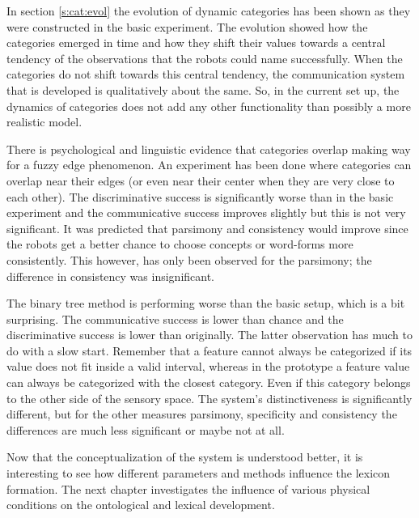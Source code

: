 \p
In section \ref{s:cat:evol} the evolution of dynamic categories has been shown as they were constructed in the basic experiment. The evolution showed how the categories emerged in time and how they shift their values towards a central tendency of the observations that the robots could name successfully. When the categories do not shift towards this central tendency, the communication system that is developed is qualitatively about the same. So, in the current set up, the dynamics of categories does not add any other functionality than possibly a more realistic model.

There is psychological and linguistic evidence that categories overlap making way for a fuzzy edge phenomenon. An experiment has been done where categories can overlap near their edges (or even near their center when they are very close to each other). The discriminative success is significantly worse than in the basic experiment and the communicative success improves slightly but this is not very significant. It was predicted that parsimony and consistency would improve since the robots get a better chance to choose concepts or word-forms more consistently. This however, has only been observed for the parsimony; the difference in consistency was insignificant.

The binary tree method is performing worse than the basic setup, which is a bit surprising. The communicative success is lower than chance and the discriminative success is lower than originally. The latter observation has much to do with a slow start. Remember that a feature cannot always be categorized if its value does not fit inside a valid interval, whereas in the prototype a feature value can always be categorized with the closest category. Even if this category belongs to the other side of the sensory space. The system's distinctiveness is significantly different, but for the other measures parsimony, specificity and consistency the differences are much less significant or maybe not at all.

\p
Now that the conceptualization of the system is understood better, it is interesting to see how different parameters and methods influence the lexicon formation. The next chapter investigates the influence of various physical conditions on the ontological and lexical development.
